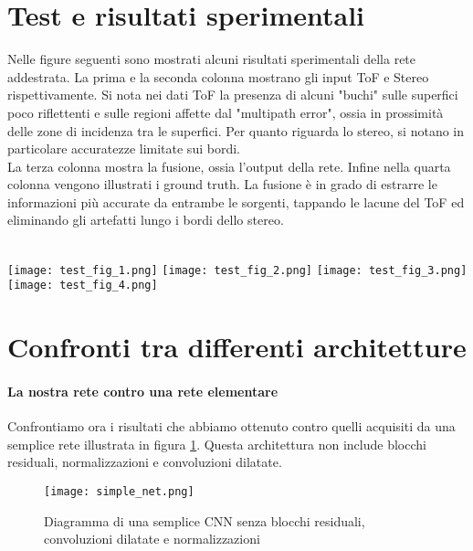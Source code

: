 \section{Test e risultati sperimentali}
Nelle figure seguenti sono mostrati alcuni risultati sperimentali della rete addestrata. La prima e la seconda colonna mostrano gli input ToF e Stereo rispettivamente. Si nota nei dati ToF la presenza di alcuni "buchi" sulle superfici poco riflettenti e sulle regioni affette dal "multipath error", ossia in prossimità delle zone di incidenza tra le superfici. Per quanto riguarda lo stereo, si notano in particolare accuratezze limitate sui bordi.\\
La terza colonna mostra la fusione, ossia l'output della rete. Infine nella quarta colonna vengono illustrati i ground truth. La fusione è in grado di estrarre le informazioni più accurate da entrambe le sorgenti, tappando le lacune del ToF ed eliminando gli artefatti lungo i bordi dello stereo.\\
\begin{minipage}{\textwidth}
    \noindent{}\\
    \texttt{[image: test\_fig\_1.png]}
    \texttt{[image: test\_fig\_2.png]}
    \texttt{[image: test\_fig\_3.png]}
    \texttt{[image: test\_fig\_4.png]}
\end{minipage}

\section{Confronti tra differenti architetture}
\paragraph{La nostra rete contro una rete elementare}Confrontiamo ora i risultati che abbiamo ottenuto contro quelli acquisiti da una semplice rete illustrata in figura \ref{simple_net}. Questa architettura non include blocchi residuali, normalizzazioni e convoluzioni dilatate.
\begin{figure}[ht]
    \centering
    \texttt{[image: simple\_net.png]}
    \caption{Diagramma di una semplice CNN senza blocchi residuali, convoluzioni dilatate e normalizzazioni}
    \label{simple_net}
\end{figure}

